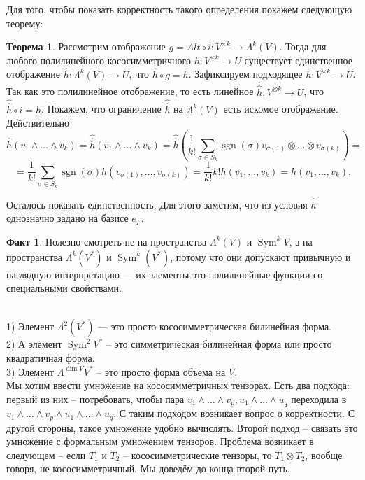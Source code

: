 \documentclass[12pt,a4paper,oneside]{book}
\theoremstyle{definition}
\newtheorem*{fact}{Факт}
\newtheorem{thm}{\color{red!40!black}Теорема}
\newcommand{\Sym}{\operatorname{Sym}}
\newcommand{\sgn}{\operatorname{sgn}}
\def\exm{\noindent {\bf Примеры:}}
\def\thrm{\begin{thm}}
\def\ethrm{\end{thm}}
\def\fct{\begin{fact}}
\def\efct{\end{fact}}
\begin{document}
Для того, чтобы показать корректность такого определения покажем следующую теорему:

\thrm Рассмотрим отображение $g=Alt \circ i \colon V^{\times k} \to \Lambda^k(V)$. Тогда для любого полилинейного кососимметричного $h \colon V^{\times k} \to U$ существует единственное отображение $\hat{h} \colon \Lambda^k(V) \to U$, что $\hat{h} \circ g = h$.
\proof Зафиксируем подходящее $h \colon V^{\times k} \to U$. Так как это полилинейное отображение, то есть линейное $\hat{\hat{h}}\colon V^{\otimes k} \to U$, что $\hat{\hat{h}} \circ i =h$. Покажем, что ограничение $\hat{\hat{h}}$ на $\Lambda^k(V)$ есть искомое отображение. Действительно $$\hat{h}(v_1\wedge\dots\wedge v_k)=\hat{\hat{h}}(v_1\wedge\dots\wedge v_k)=\hat{\hat{h}} \left(\frac{1}{k!} \sum_{\sigma \in S_k} \sgn(\sigma) v_{\sigma(1)}\otimes \dots \otimes v_{\sigma(k)} \right) =$$
$$=\frac{1}{k!} \sum_{\sigma \in S_k} \sgn(\sigma) h(v_{\sigma(1)},\dots,v_{\sigma(k)})=\frac{1}{k!}k!h(v_1,\dots,v_k)=h(v_1,\dots,v_k).$$

Осталось показать единственность. Для этого заметим, что из условия  $\hat{h}$ однозначно задано на базисе $e_{\Gamma}$.
\endproof
\ethrm


\fct Полезно смотреть не на пространства $\Lambda^k (V)$ и $\Sym^k V$, а на пространства $\Lambda^k(V^*)$ и $\Sym^k(V^*)$, потому что они допускают привычную и наглядную интерпретацию --- их элементы это полилинейные функции со специальными свойствами.
\efct


\exm \\
1) Элемент $\Lambda^2(V^*)$ --- это просто кососимметрическая билинейная форма.\\
2) А элемент $\Sym^2 V^*$ -- это симметрическая билинейная форма или просто квадратичная форма.\\
3) Элемент $\Lambda^{\dim V} V^*$ -- это просто форма объёма на $V$.\\

Мы хотим ввести умножение на кососимметричных тензорах. Есть два подхода: первый из них -- потребовать, чтобы пара $v_1 \wedge \dots \wedge v_p , u_1\wedge \dots \wedge u_q$ переходила в $v_1 \wedge \dots \wedge v_p \wedge u_1\wedge \dots \wedge u_q$. С таким подходом возникает вопрос о корректности. С другой стороны, такое умножение удобно вычислять. Второй подход -- связать это умножение с формальным умножением тензоров. Проблема возникает в следующем -- если $T_1$ и $T_2$ -- кососимметрические тензоры, то $T_1\otimes T_2$, вообще говоря, не кососимметричный. Мы доведём до конца второй путь.
\end{document}
